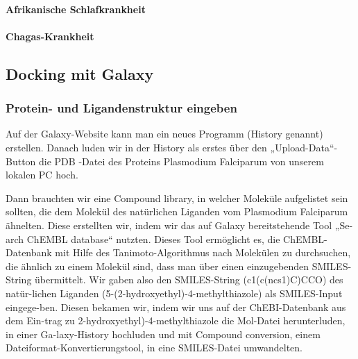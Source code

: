 \documentclass[11pt]{article}
\begin{document}
    \paragraph{Afrikanische Schlafkrankheit}

    \paragraph{Chagas-Krankheit}

    \subsection{Docking mit Galaxy}\label{subsec:galaxy}

%
%
%

    \subsubsection{Protein- und Ligandenstruktur eingeben}\label{subsec:protein--und-ligandenstruktur-eingeben}

    Auf der Galaxy-Website kann man ein neues Programm (History genannt) erstellen. Danach luden wir in der History als erstes über den „Upload-Data“-Button die PDB -Datei des Proteins Plasmodium Falciparum von unserem lokalen PC hoch.

    Dann brauchten wir eine Compound library, in welcher Moleküle aufgelistet sein sollten, die dem Molekül des natürlichen Liganden vom Plasmodium Falciparum ähnelten. Diese erstellten wir, indem wir das auf Galaxy bereitstehende Tool „Se-arch ChEMBL database“ nutzten. Dieses Tool ermöglicht es, die ChEMBL-Datenbank mit Hilfe des Tanimoto-Algorithmus nach Molekülen zu durchsuchen, die ähnlich zu einem Molekül sind, dass man über einen einzugebenden SMILES-String übermittelt. Wir gaben also den SMILES-String (c1(c(ncs1)C)CCO) des natür-lichen Liganden (5-(2-hydroxyethyl)-4-methylthiazole) als SMILES-Input eingege-ben. Diesen bekamen wir, indem wir uns auf der ChEBI-Datenbank aus dem Ein-trag zu 2-hydroxyethyl)-4-methylthiazole die Mol-Datei herunterluden, in einer Ga-laxy-History hochluden und mit Compound conversion, einem Dateiformat-Konvertierungstool, in eine SMILES-Datei umwandelten.
\end{document}
